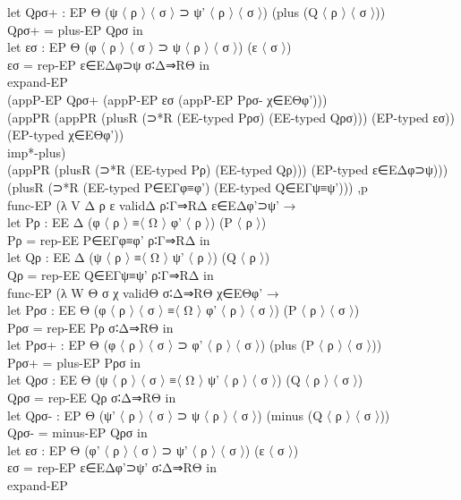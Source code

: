 {\begin{code}
{\>    let Qρσ+ : EP Θ (ψ 〈 ρ 〉 〈 σ 〉 ⊃ ψ' 〈 ρ 〉 〈 σ 〉) (plus (Q 〈 ρ 〉 〈 σ 〉))\<\\
\>        Qρσ+ = plus-EP Qρσ in\<\\
\>    let εσ : EP Θ (φ 〈 ρ 〉 〈 σ 〉 ⊃ ψ 〈 ρ 〉 〈 σ 〉) (ε 〈 σ 〉)\<\\
\>        εσ = rep-EP ε∈EΔφ⊃ψ σ∶Δ⇒RΘ in\<\\
\>    expand-EP \<\\
\>    (appP-EP Qρσ+ (appP-EP εσ (appP-EP Pρσ- χ∈EΘφ')))\<\\
\>    (appPR (appPR (plusR (⊃*R (EE-typed Pρσ) (EE-typed Qρσ))) (EP-typed εσ)) (EP-typed χ∈EΘφ')) \<\\
\>    imp*-plus) \<\\
\>    (appPR (plusR (⊃*R (EE-typed Pρ) (EE-typed Qρ))) (EP-typed ε∈EΔφ⊃ψ))) \<\\
\>  (plusR (⊃*R (EE-typed P∈EΓφ≡φ') (EE-typed Q∈EΓψ≡ψ'))) ,p \<\\
\>  func-EP (λ V Δ ρ ε validΔ ρ∶Γ⇒RΔ ε∈EΔφ'⊃ψ' →\<\\
\>    let Pρ : EE Δ (φ 〈 ρ 〉 ≡〈 Ω 〉 φ' 〈 ρ 〉) (P 〈 ρ 〉)\<\\
\>        Pρ = rep-EE P∈EΓφ≡φ' ρ∶Γ⇒RΔ in\<\\
\>    let Qρ : EE Δ (ψ 〈 ρ 〉 ≡〈 Ω 〉 ψ' 〈 ρ 〉) (Q 〈 ρ 〉)\<\\
\>        Qρ = rep-EE Q∈EΓψ≡ψ' ρ∶Γ⇒RΔ in\<\\
\>    func-EP (λ W Θ σ χ validΘ σ∶Δ⇒RΘ χ∈EΘφ' → \<\\
\>      let Pρσ : EE Θ (φ 〈 ρ 〉 〈 σ 〉 ≡〈 Ω 〉 φ' 〈 ρ 〉 〈 σ 〉) (P 〈 ρ 〉 〈 σ 〉)\<\\
\>          Pρσ = rep-EE Pρ σ∶Δ⇒RΘ in\<\\
\>      let Pρσ+ : EP Θ (φ 〈 ρ 〉 〈 σ 〉 ⊃ φ' 〈 ρ 〉 〈 σ 〉) (plus (P 〈 ρ 〉 〈 σ 〉))\<\\
\>          Pρσ+ = plus-EP Pρσ in\<\\
\>      let Qρσ : EE Θ (ψ 〈 ρ 〉 〈 σ 〉 ≡〈 Ω 〉 ψ' 〈 ρ 〉 〈 σ 〉) (Q 〈 ρ 〉 〈 σ 〉)\<\\
\>          Qρσ = rep-EE Qρ σ∶Δ⇒RΘ in\<\\
\>      let Qρσ- : EP Θ (ψ' 〈 ρ 〉 〈 σ 〉 ⊃ ψ 〈 ρ 〉 〈 σ 〉) (minus (Q 〈 ρ 〉 〈 σ 〉))\<\\
\>          Qρσ- = minus-EP Qρσ in\<\\
\>      let εσ : EP Θ (φ' 〈 ρ 〉 〈 σ 〉 ⊃ ψ' 〈 ρ 〉 〈 σ 〉) (ε 〈 σ 〉)\<\\
\>          εσ = rep-EP ε∈EΔφ'⊃ψ' σ∶Δ⇒RΘ in \<\\
\>      expand-EP \<\\
}
\end{code}}
